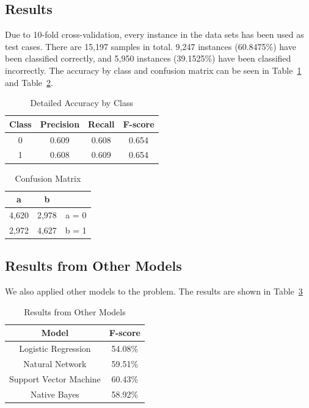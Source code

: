 \documentclass{article}
\begin{document}
\subsection{Results}
Due to 10-fold cross-validation, every instance in the data sets has been used as test cases.
There are 15,197 samples in total.
9,247 instances (60.8475\%) have been classified correctly, and 5,950 instances (39.1525\%) have been classified incorrectly.
The accuracy by class and confusion matrix can be seen in Table~\ref{table:accuracy} and Table~\ref{table:matrix}.


\begin{table}
\begin{center}
\begin{tabular}{|c|c|c|c|}
\hline
Class & Precision & Recall & F-score \\ \hline
0 & 0.609 & 0.608 & 0.654 \\ \hline
1 & 0.608 & 0.609 & 0.654 \\ \hline
\end{tabular}
\caption{Detailed Accuracy by Class}
\label{table:accuracy}
\end{center}
\end{table}

\begin{table}
\begin{center}
\begin{tabular}{|c|c|c|}
\hline
a & b & \\ \hline
4,620 & 2,978 & a = 0 \\ \hline
2,972 & 4,627 & b = 1 \\ \hline
\end{tabular}
\caption{Confusion Matrix}
\label{table:matrix}
\end{center}
\end{table}

\subsection{Results from Other Models}
We also applied other models to the problem.
 The results are shown in Table~\ref{table:others}

\begin{table}
\begin{center}
\begin{tabular}{|c|c|}
\hline
Model & F-score \\ \hline
Logistic Regression & 54.08\% \\ \hline
Natural Network & 59.51\% \\ \hline
Support Vector Machine & 60.43\% \\ \hline
Native Bayes & 58.92\% \\ \hline
\end{tabular}
\caption{Results from Other Models}
\label{table:others}
\end{center}
\end{table}
\end{document}
